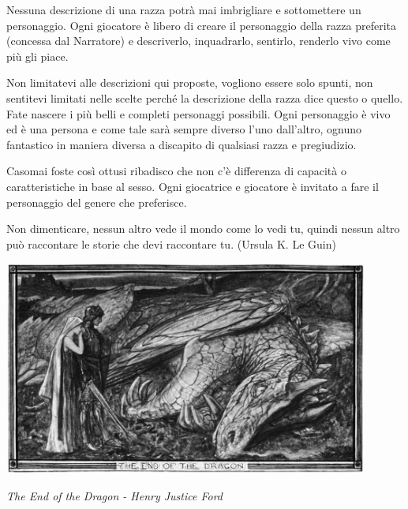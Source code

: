 

\begin{giocatore}
Nessuna descrizione di una razza potrà mai imbrigliare e sottomettere un personaggio. Ogni giocatore è libero di creare il personaggio della razza preferita (concessa dal Narratore) e descriverlo, inquadrarlo, sentirlo, renderlo vivo come più gli piace.

Non limitatevi alle descrizioni qui proposte, vogliono essere solo spunti, non sentitevi limitati nelle scelte perché la descrizione della razza dice questo o quello.
Fate nascere i più belli e completi personaggi possibili. Ogni personaggio è vivo ed è una persona e come tale sarà sempre diverso l'uno dall'altro, ognuno fantastico in maniera diversa a discapito di qualsiasi razza e pregiudizio.
\end{giocatore}

\begin{giocatore}
Casomai foste così ottusi ribadisco che non c'è differenza di capacità o caratteristiche in base al sesso. Ogni giocatrice e giocatore è invitato a fare il personaggio del genere che preferisce.
\end{giocatore}

\begin{enfasi}
Non dimenticare, nessun altro vede il mondo come lo vedi tu, quindi nessun altro può raccontare le storie che devi raccontare tu. (Ursula K. Le Guin)
\end{enfasi}

\vfill

\begin{center}
\includegraphics[keepaspectratio,width=0.9\textwidth]{immagini/Dragon_by_Henry_Justice_Ford_grey.png}

\emph{The End of the Dragon - Henry Justice Ford}
\end{center}

\pagebreak
